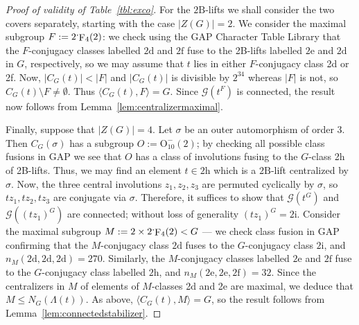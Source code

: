 \documentclass[11pt,a4paper]{amsart}
\theoremstyle{plain}
\theoremstyle{definition}
\theoremstyle{remark}
\theoremstyle{remark}
\theoremstyle{remark}
\theoremstyle{definition}
\newcommand{\ns}{\mathbin{\mspace{-4mu}\vcenter{\hbox{\raisebox{1ex}{$\cdot$}}}\mspace{-4mu}}}
\newcommand{\GG}{\mathcal{G}}
\DeclareMathOperator{\F}{F}
\begin{document}
\begin{proof}[Proof of validity of Table~\ref{tbl:exco}]
For the $\mathrm{2B}$-lifts we shall consider the two covers separately, starting with the case $|Z(G)|=2$. We consider the maximal subgroup $F:=2\ns\F_4(2)$: we check using the {\sf GAP} Character Table Library that the $F$-conjugacy classes labelled $\mathrm{2d}$ and $\mathrm{2f}$ fuse to the 2B-lifts labelled $\mathrm{2e}$ and $\mathrm{2d}$ in $G$, respectively, so we may assume that $t$ lies in either $F$-conjugacy class 2d or 2f. Now, $|C_G(t)|<|F|$ and $|C_G(t)|$ is divisible by $2^{34}$ whereas $|F|$ is not, so $C_G(t)\setminus F\ne\emptyset$. Thus $\langle C_G(t),F\rangle=G$. Since $\GG(t^F)$ is connected, the result now follows from Lemma~\ref{lem:centralizermaximal}.

Finally, suppose that $|Z(G)|=4$. Let $\sigma$ be an outer automorphism of order $3$. Then $C_G(\sigma)$ has a subgroup $O:=\mathrm{O}_{10}^-(2)$; by checking all possible class fusions in {\sf GAP} we see that $O$ has a class of involutions fusing to the $G$-class 2h of 2B-lifts. Thus, we may find an element $t\in\mathrm{2h}$ which is a $\mathrm{2B}$-lift centralized by $\sigma$. Now, the three central involutions $z_1,z_2,z_3$ are permuted cyclically by $\sigma$, so $tz_1,tz_2,tz_3$ are conjugate via $\sigma$. Therefore, it suffices to show that $\GG(t^G)$ and $\GG((tz_1)^G)$ are connected; without loss of generality $(tz_1)^G=\mathrm{2i}$. Consider the maximal subgroup $M:=2\times2\ns\F_4(2)<G$ --- we check class fusion in {\sf GAP} confirming that the $M$-conjugacy class $\mathrm{2d}$ fuses to the $G$-conjugacy class $\mathrm{2i}$, and $n_M(\mathrm{2d,2d,2d})=270$. Similarly, the $M$-conjugacy classes labelled $\mathrm{2e}$ and $\mathrm{2f}$ fuse to the $G$-conjugacy class labelled $\mathrm{2h}$, and $n_M(\mathrm{2e,2e,2f})=32$. Since the centralizers in $M$ of elements of $M$-classes 2d and 2e are maximal, we deduce that $M\leq N_G(\Lambda(t))$. As above, $\langle C_G(t),M\rangle =G$, so the result follows from Lemma~\ref{lem:connectedstabilizer}.
\end{proof}
\end{document}
